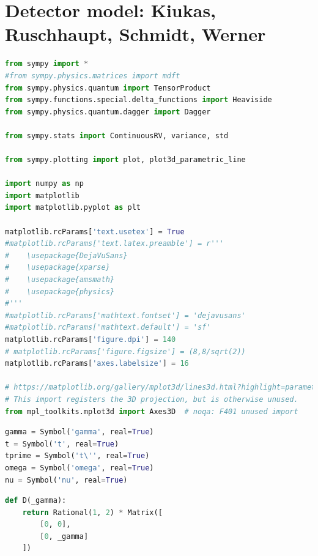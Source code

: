 \graphicspath{{tex/appendix/nb/jupyter/detect/}}

\hypertarget{detector-model-kiukas-ruschhaupt-schmidt-werner}{%
\section[Detector model: Kiukas, Ruschhaupt, Schmidt, Werner]{Detector model: Kiukas, Ruschhaupt, \linebreak[4] Schmidt, Werner}
\label{detector-model-kiukas-ruschhaupt-schmidt-werner}}

\begin{lstlisting}[language=Python]
from sympy import *
#from sympy.physics.matrices import mdft
from sympy.physics.quantum import TensorProduct
from sympy.functions.special.delta_functions import Heaviside
from sympy.physics.quantum.dagger import Dagger

from sympy.stats import ContinuousRV, variance, std

from sympy.plotting import plot, plot3d_parametric_line

import numpy as np
import matplotlib
import matplotlib.pyplot as plt

matplotlib.rcParams['text.usetex'] = True
#matplotlib.rcParams['text.latex.preamble'] = r'''
#    \usepackage{DejaVuSans}
#    \usepackage{xparse}
#    \usepackage{amsmath}
#    \usepackage{physics}
#'''
#matplotlib.rcParams['mathtext.fontset'] = 'dejavusans' 
#matplotlib.rcParams['mathtext.default'] = 'sf'
matplotlib.rcParams['figure.dpi'] = 140
# matplotlib.rcParams['figure.figsize'] = (8,8/sqrt(2))
matplotlib.rcParams['axes.labelsize'] = 16

# https://matplotlib.org/gallery/mplot3d/lines3d.html?highlight=parametric
# This import registers the 3D projection, but is otherwise unused.
from mpl_toolkits.mplot3d import Axes3D  # noqa: F401 unused import
\end{lstlisting}

\begin{lstlisting}[language=Python]
gamma = Symbol('gamma', real=True)
t = Symbol('t', real=True)
tprime = Symbol('t\'', real=True)
omega = Symbol('omega', real=True)
nu = Symbol('nu', real=True)
\end{lstlisting}

\begin{lstlisting}[language=Python]
def D(_gamma):
    return Rational(1, 2) * Matrix([
        [0, 0],
        [0, _gamma]
    ])
\end{lstlisting}

